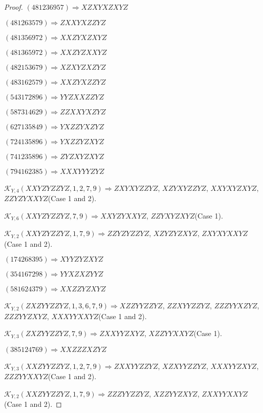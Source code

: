 \documentclass[12pt]{article}
\theoremstyle{plain}
\theoremstyle{definition}
\theoremstyle{remark}
\newcommand{\fancy}[1]{\mathcal{#1}}
\def\K{\fancy{K}}
\begin{document}
\begin{proof}
	$(4 8 1 2 3 6 9 5 7)\Rightarrow XZXYXZXYZ$
	
	$(4 8 1 2 6 3 5 7 9)\Rightarrow ZXXYXZZYZ$
	
	$(4 8 1 3 5 6 9 7 2)\Rightarrow XXZYXZXYZ$
	
	$(4 8 1 3 6 5 9 7 2)\Rightarrow XXZYZXXYZ$
	
	$(4 8 2 1 5 3 6 7 9)\Rightarrow XZXYZXZYZ$
	
	$(4 8 3 1 6 2 5 7 9)\Rightarrow XXZYXZZYZ$
	
	$(5 4 3 1 7 2 8 9 6)\Rightarrow YYZXXZZYZ$
	
	$(5 8 7 3 1 4 6 2 9)\Rightarrow ZZXXYXZYZ$
	
	$(6 2 7 1 3 5 8 4 9)\Rightarrow YXZZYXZYZ$
	
	$(7 2 4 1 3 5 8 9 6)\Rightarrow YXZZYZXYZ$
	
	$(7 4 1 2 3 5 8 9 6)\Rightarrow ZYZXYZXYZ$
	
	$(7 9 4 1 6 2 3 8 5)\Rightarrow XXXYYYZYZ$
	
	
	
	$\K_{Y,4}(XXYZYZZYZ,1, 2, 7, 9)\Rightarrow $$ZXYXYZZYZ$, $XZYXYZZYZ$, $XXYXYZXYZ$, $ZZYZYXXYZ$(Case 1 and 2).
	
	$\K_{Y,6}(XXYZYZZYZ,7, 9)\Rightarrow $$XXYZYXXYZ$, $ZZYXYZXYZ$(Case 1).
	
	$\K_{Y,2}(XXYZYZZYZ,1, 7, 9)\Rightarrow $$ZZYZYZZYZ$, $XZYZYZXYZ$, $ZXYXYXXYZ$(Case 1 and 2).
	
	
	
	$(1 7 4 2 6 8 3 9 5)\Rightarrow XYYZYZXYZ$
	
	$(3 5 4 1 6 7 2 9 8)\Rightarrow YYXZXZYYZ$
	
	$(5 8 1 6 2 4 3 7 9)\Rightarrow XXZZYZXYZ$
	
	
	
	$\K_{Y,2}(ZXZYYZZYZ,1, 3, 6, 7, 9)\Rightarrow $$XZZYYZZYZ$, $ZZXYYZZYZ$, $ZZZYYXZYZ$, $ZZZYYZXYZ$, $XXXYYXXYZ$(Case 1 and 2).
	
	$\K_{Y,3}(ZXZYYZZYZ,7, 9)\Rightarrow $$ZXXYYZXYZ$, $XZZYYXXYZ$(Case 1).
	
	
	
	$(3 8 5 1 2 4 7 6 9)\Rightarrow XXZZZXZYZ$
	
	
	
	$\K_{Y,3}(XXZYYZZYZ,1, 2, 7, 9)\Rightarrow $$ZXXYYZZYZ$, $XZXYYZZYZ$, $XXXYYZXYZ$, $ZZZYYXXYZ$(Case 1 and 2).
	
	$\K_{Y,2}(XXZYYZZYZ,1, 7, 9)\Rightarrow $$ZZZYYZZYZ$, $XZZYYZXYZ$, $ZXXYYXXYZ$(Case 1 and 2).
	
	
	

\end{proof}
\end{document}

